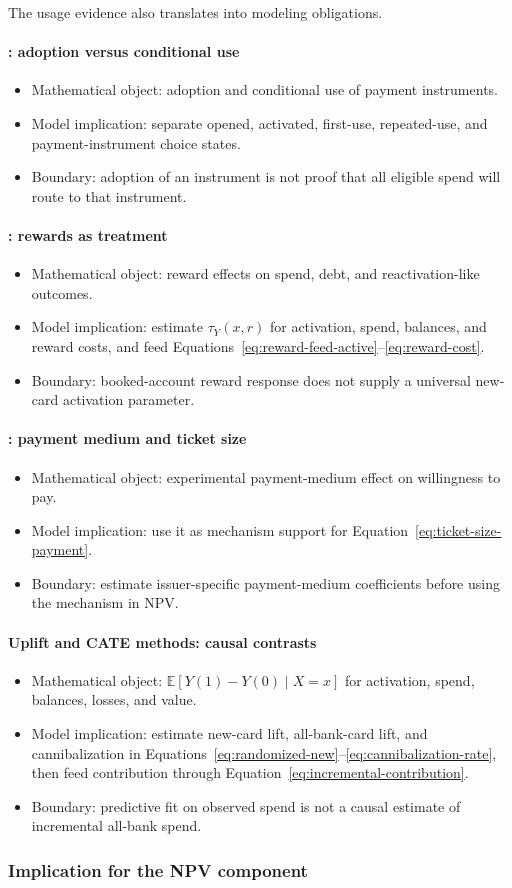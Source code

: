\documentclass[11pt]{article}
\newcommand{\E}{\mathbb{E}}
\newcommand{\1}{\mathbf{1}}
\newcommand{\contractitem}[2]{\paragraph{#1}\begin{itemize}[leftmargin=1.5em,itemsep=0.12em,topsep=0.18em]#2\end{itemize}}
\begin{document}
The usage evidence also translates into modeling obligations.
\contractitem{\citet{koulayev2012payment}: adoption versus conditional use}{
  \item Mathematical object: adoption and conditional use of payment
        instruments.
  \item Model implication: separate opened, activated, first-use, repeated-use,
        and payment-instrument choice states.
  \item Boundary: adoption of an instrument is not proof that all eligible
        spend will route to that instrument.
}
\contractitem{\citet{agarwal2010rewards}: rewards as treatment}{
  \item Mathematical object: reward effects on spend, debt, and
        reactivation-like outcomes.
  \item Model implication: estimate $\tau_Y(x,r)$ for activation, spend,
        balances, and reward costs, and feed
        Equations~\eqref{eq:reward-feed-active}--\eqref{eq:reward-cost}.
  \item Boundary: booked-account reward response does not supply a universal
        new-card activation parameter.
}
\contractitem{\citet{prelec2001creditcard}: payment medium and ticket size}{
  \item Mathematical object: experimental payment-medium effect on willingness
        to pay.
  \item Model implication: use it as mechanism support for
        Equation~\eqref{eq:ticket-size-payment}.
  \item Boundary: estimate issuer-specific payment-medium coefficients before
        using the mechanism in NPV.
}
\contractitem{Uplift and CATE methods: causal contrasts}{
  \item Mathematical object:
        $\E[Y(1)-Y(0)\mid X=x]$ for activation, spend, balances, losses, and
        value.
  \item Model implication: estimate new-card lift, all-bank-card lift, and
        cannibalization in
        Equations~\eqref{eq:randomized-new}--\eqref{eq:cannibalization-rate},
        then feed contribution through
        Equation~\eqref{eq:incremental-contribution}.
  \item Boundary: predictive fit on observed spend is not a causal estimate of
        incremental all-bank spend.
}

\subsubsection{Implication for the NPV component}
\label{subsec:usage-component-implication}
\end{document}
